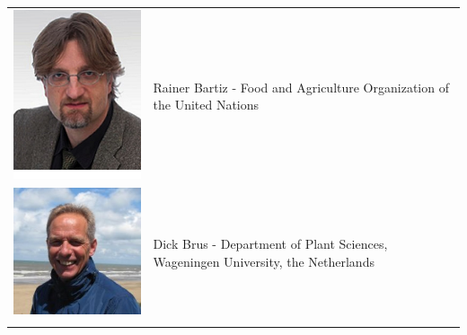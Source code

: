 \documentclass[10pt,b5paper,]{book}
\theoremstyle{definition}
\theoremstyle{definition}
\theoremstyle{definition}
\theoremstyle{remark}
\begin{document}
\begin{longtable}[]{@{}ll@{}}
\toprule
\endhead
\begin{minipage}[t]{0.13\columnwidth}\raggedright
\includegraphics{contrAuthors/Baritz.jpg}\strut
\end{minipage} & \begin{minipage}[t]{0.81\columnwidth}\raggedright
Rainer Bartiz - Food and Agriculture Organization of the United
Nations\strut
\end{minipage}\tabularnewline
\begin{minipage}[t]{0.13\columnwidth}\raggedright
\includegraphics{contrAuthors/Brus.jpg}\strut
\end{minipage} & \begin{minipage}[t]{0.81\columnwidth}\raggedright
Dick Brus - Department of Plant Sciences, Wageningen University, the
Netherlands\strut
\end{minipage}\tabularnewline
\begin{minipage}[t]{0.13\columnwidth}\raggedright

\end{minipage}
\end{longtable}
\end{document}
